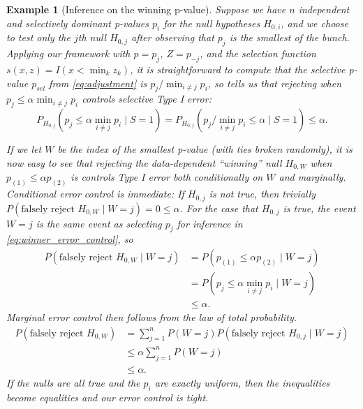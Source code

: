 \documentclass{article}
\newtheorem{example}{Example}
\begin{document}
\begin{example}[Inference on the winning p-value]
    \label{exm:winner} Suppose we have $n$ independent and selectively dominant p-values $p_i$ for the null hypotheses $H_{0, i}$, and we choose to test only the $j$th null $H_{0, j}$ after observing that $p_j$ is the smallest of the bunch. Applying our framework with $p =p_j$, $Z = p_{-j}$, and the selection function $s(x, z) = I(x < \min_{k} z_k)$, it is straightforward to compute that the selective p-value $p_{sel}$ from \eqref{eq:adjustment} is $p_j/\min_{i \neq j} p_i$, so  tells us that rejecting when $p_j \leq \alpha \min_{i \neq j} p_i$ controls selective Type I error:
    \begin{equation}
        \label{eq:winner_error_control}
        P_{H_{0, j}}(p_j \leq \alpha \min_{i \neq j} p_i \mid S = 1) = P_{H_{0, j}}(p_j/\min_{i \neq j} p_i \leq \alpha  \mid S = 1) \leq \alpha.
    \end{equation} 

    If we let $W$ be the index of the smallest p-value (with ties broken randomly), it is now easy to see that rejecting the data-dependent ``winning'' null $H_{0, W}$ when $p_{(1)} \leq \alpha p_{(2)}$ is controls Type I error both conditionally on $W$ and marginally. Conditional error control is immediate: If $H_{0, j}$ is not true, then trivially $P(\text{falsely reject } H_{0, W} \mid W = j) = 0 \leq \alpha$. For the case that $H_{0, j}$ is true, the event $W=j$ is the same event as selecting $p_j$ for inference in \eqref{eq:winner_error_control}, so 
    \begin{align*}
        P(\text{falsely reject } H_{0, W} \mid W = j) &= P(p_{(1)} \leq \alpha p_{(2)} \mid W = j)\\
        &= P(p_j \leq \alpha \min_{i \neq j} p_i \mid W = j)\\
        &\leq \alpha.
    \end{align*}
    Marginal error control then follows from the law of total probability. 
    \begin{align*}
        P(\text{falsely reject } H_{0, W}) &= \sum_{j=1}^n P(W=j)P(\text{falsely reject } H_{0, j} \mid W = j) \\
                                          &\leq \alpha \sum_{j=1}^n P(W=j)\\
                                          &\leq \alpha. 
    \end{align*}
    If the nulls are all true and the $p_i$ are exactly uniform, then the inequalities become equalities and our error control is tight. 
\end{example}
\end{document}
